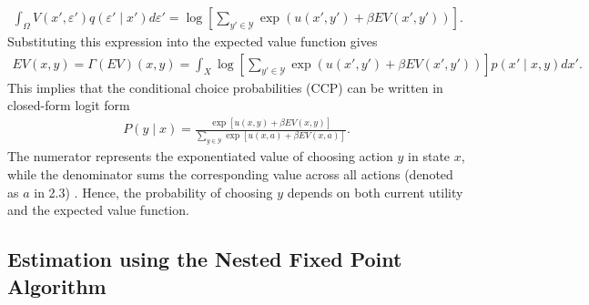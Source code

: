\begin{align*}
    \int_{\Omega}
    V(x',\varepsilon')
    q(\varepsilon' \mid x')
    d\varepsilon'
    =
    \log
    \left[
    \sum_{y' \in \mathcal{Y}}
    \exp
    \left(
    u(x',y')
    +
    \beta EV(x',y')
    \right)
    \right].
\end{align*}
Substituting this expression into the expected value function gives
\begin{align*}
    EV(x,y)
    =
    \Gamma(EV)(x,y)
    =
    \int_X
    \log
    \left[
    \sum_{y' \in \mathcal{Y}}
    \exp
    \left(
    u(x',y')
    +
    \beta EV(x',y')
    \right)
    \right]
    p(x' \mid x,y)
    dx'.
\end{align*}
This implies that the conditional choice probabilities (CCP) can be written in closed-form logit form
\begin{align*}
    P(y \mid x)
    =
    \frac{
    \exp
    \left[
    u(x,y)
    +
    \beta EV(x,y)
    \right]
    }{
    \sum_{y  \in \mathcal{Y}}  
    \exp
    \left[
    u(x,a)
    +
    \beta EV(x,a)
    \right] \tag{2.3}
    }.
\end{align*}
The numerator represents the exponentiated value of choosing action $y$ in state $x$, while the denominator sums the corresponding value across all actions (denoted as $a$ in 2.3) . Hence, the probability of choosing $y$ depends on both current utility and the expected value function. 

\subsection{Estimation using the Nested Fixed Point Algorithm}

